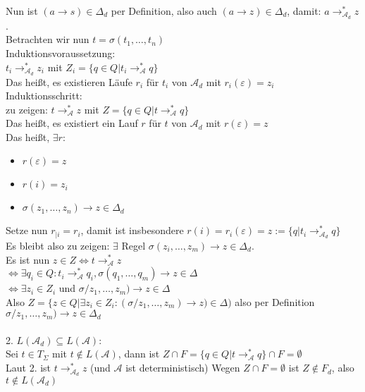 \documentclass[titlepage]{article}
\begin{document}
Nun ist $( a \rightarrow s) \in \Delta_d$ per Definition, also auch $( a \rightarrow z) \in \Delta_d$, damit: $a \rightarrow ^\ast_{\mathcal{A}_d} z$.\\

Betrachten wir nun $ t = \sigma(t_1, \dots , t_n) $ \\

Induktionsvoraussetzung:\\
$t_i \rightarrow ^\ast_{\mathcal{A}_d} z_i$ mit $Z_i = \{q \in Q | t_i \rightarrow ^\ast_\mathcal{A} q\}$\\
Das hei\ss t, es existieren L\"aufe $r_i$ f\"ur $t_i$ von $\mathcal{A}_d$ mit $r_i(\varepsilon) = z_i$\\

Induktionsschritt:\\
zu zeigen: $ t \rightarrow ^\ast_\mathcal{A} z$ mit $Z = \{ q \in Q | t \rightarrow ^\ast_\mathcal{A} q \} $ \\
Das hei\ss t, es existiert ein Lauf $r$ f\"ur $t$ von $\mathcal{A}_d$ mit $r(\varepsilon) = z$\\
Das hei\ss t, $\exists r :$\\

\begin{itemize}
	\item $r (\varepsilon) = z$
	\item $r (i) = z_i$
	\item $\sigma (z_1, \dots, z_n) \rightarrow z \in \Delta_d$
\end{itemize}

Setze nun $r_{ |i } = r_i$, damit ist insbesondere $r(i) = r_i(\varepsilon) = z := \{q | t_i \rightarrow ^\ast_{\mathcal{A}_d} q \}$\\

Es bleibt also zu zeigen: $ \exists$ Regel $\sigma (z_i, \dots, z_m) \rightarrow z \in \Delta_d$.\\
Es ist nun $ z \in Z \Leftrightarrow t \rightarrow ^\ast_\mathcal{A} z$ \\
$\Leftrightarrow \exists q_i \in Q: t_i \rightarrow ^\ast_\mathcal{A} q_i, \sigma(q_1, \dots, q_m) \rightarrow z \in \Delta$\\
$\Leftrightarrow \exists z_i \in Z_i$ und $\sigma/z_1, \dots , z_m) \rightarrow z \in \Delta$ \\
Also $Z= \{z\in Q | \exists z_i \in Z_i : (\sigma/z_1, \dots , z_m) \rightarrow z ) \in \Delta)$ also per Definition
$\sigma/z_1, \dots , z_m) \rightarrow z \in \Delta_d$\\ \\

2. \glqq$L(\mathcal{A}_d) \subseteq L(\mathcal{A})$\grqq:\\

Sei $t \in T_\Sigma$ mit $t \notin L(\mathcal{A})$, dann ist $Z \cap F = \{ q \in Q | t \rightarrow^\ast_\mathcal{A} q \} \cap F = \emptyset$\\
Laut 2. ist $t \rightarrow ^\ast_{\mathcal{A}_d} z$ (und $\mathcal{A}$ ist deterministisch)
Wegen $Z \cap F = \emptyset$ ist $Z \notin F_d$, also $t \notin L(\mathcal{A}_d)$
\end{document}
